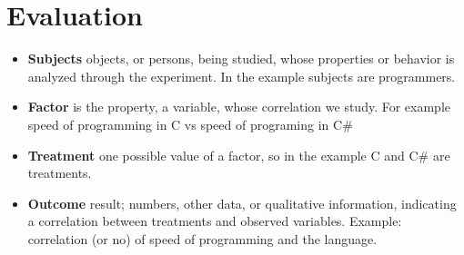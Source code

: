 \chapter{Evaluation}
\begin{itemize}
\item \textbf{Subjects} objects, or persons, being studied, whose properties or behavior is analyzed through the experiment. In the example subjects are programmers. 
\item \textbf{Factor} is the property, a variable, whose correlation we study. For example speed of programming in C vs speed of programing in C\#
\item \textbf{Treatment} one possible value of a factor, so in the example C and C\# are treatments.
\item \textbf{Outcome} result; numbers, other data, or qualitative information, indicating a correlation between treatments and observed variables. Example: correlation (or no) of speed of programming and the language.
\end{itemize}
